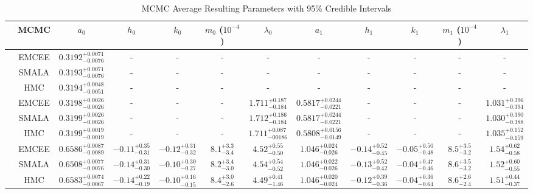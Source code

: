 \documentclass{aa}
\begin{document}
\begin{appendix} 

\begin{table}
\caption{MCMC Average Resulting Parameters with 95\% Credible Intervals}\label{Table4}
\centering
\begin{tabular}{c c c c c c c c c c c c}        %
\hline\hline                 %
 & MCMC & $a_0$ & $h_0$ & $k_0$ & $m_0$ ($10^{-4}$) & $\lambda_0$ & $a_1$ & $h_1$ & $k_1$ & $m_1$ ($10^{-4}$) & $\lambda_1$ \\    %
\hline                        %
   \rule{0pt}{4ex}  \multirow{5}{*}{$N=1$} & EMCEE & $0.3192^{+0.0071}_{-0.0076}$ & - & - & - & - & - & - & - & - & - \\
   \rule{0pt}{4ex} & SMALA &  $0.3193^{+0.0071}_{-0.0076}$ & - & - & - & - & - & - & - & - & -\\
    \rule{0pt}{4ex} & HMC &  $0.3194^{+0.0048}_{-0.0051}$ & - & - & - & - & - & - & - & - & -\\
   \rule{0pt}{4ex}  \multirow{5}{*}{$N=4$} & EMCEE & $0.3198^{+0.0026}_{-0.0026}$ & - & - & - & $1.711^{+0.187}_{-0.184}$ & $0.5817^{+0.0244}_{-0.0221}$ & - & - & - & $1.031^{+0.396}_{-0.394}$ \\
   \rule{0pt}{4ex} & SMALA &  $0.3199^{+0.0026}_{-0.0026}$ & - & - & - & $1.712^{+0.186}_{-0.184}$ & $0.5817^{+0.0244}_{-0.0221}$ & - & - & - & $1.030^{+0.390}_{-0.388}$\\
    \rule{0pt}{4ex} & HMC &  $0.3199^{+0.0019}_{-0.0019}$ & - & - & - & $1.711^{+0.087}_{-00186}$ & $0.5808^{+0.0156}_{-0.0149}$ & - & - & - & $1.035^{+0.152}_{-0.159}$\\
   \rule{0pt}{4ex} \multirow{5}{*}{$N=10$} & EMCEE & $0.6586^{+0.0087}_{-0.0089}$ & $-0.11^{+0.35}_{-0.31}$ & $-0.12^{+0.31}_{-0.32}$ & $8.1^{+3.3}_{-3.4}$ & $4.52^{+0.55}_{-0.50}$ & $1.046^{+0.024}_{-0.026}$ & $-0.14^{+0.52}_{-0.45}$ & $-0.05^{+0.50}_{-0.48}$ & $8.5^{+3.5}_{-3.2}$ & $1.54^{+0.62}_{-0.58}$ \\
   \rule{0pt}{4ex} & SMALA & $0.6508^{+0.0077}_{-0.0076}$ & $-0.14^{+0.31}_{-0.30}$ & $-0.10^{+0.30}_{-0.27}$ & $8.2^{+3.4}_{-3.0}$ & $4.54^{+0.54}_{-0.52}$ & $1.046^{+0.022}_{-0.026}$ & $-0.13^{+0.52}_{-0.42}$ & $-0.04^{+0.47}_{-0.46}$ & $8.6^{+3.5}_{-3.2}$ & $1.52^{+0.60}_{-0.55}$\\
   \rule{0pt}{4ex} & HMC & $0.6583^{+0.0074}_{-0.0067}$ & $-0.14^{+0.22}_{-0.19}$ & $-0.10^{+0.16}_{-0.15}$ & $8.4^{+3.0}_{-2.6}$ & $4.49^{+0.41}_{-1.46}$ & $1.046^{+0.020}_{-0.024}$ & $-0.12^{+0.39}_{-0.36}$ & $-0.04^{+0.36}_{-0.64}$ & $8.6^{+2.6}_{-2.4}$ & $1.51^{+0.44}_{-0.37}$\\
\hline  
\end{tabular}
\end{table}

\end{appendix}

\end{document}
